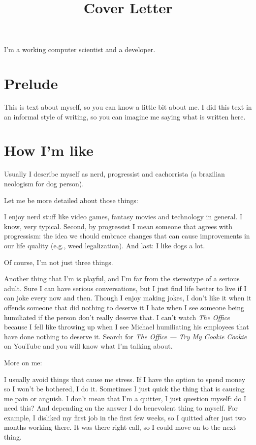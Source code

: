 \documentclass[11pt,a4paper,sans]{moderncv}
\title{Cover Letter}
\begin{document}
\makecvtitle %
I'm a working computer scientist and a developer.

\section{Prelude}
This is text about myself, so you can know a little bit about me.
I did this text in an informal style of writing, so you can imagine me saying what is written here.

\section{How I'm like}
Usually I describe myself as nerd, progressist and cachorrista (a brazilian neologism for dog person).

Let me be more detailed about those things:

I enjoy nerd stuff like video games, fantasy movies and technology in general.
I know, very typical.
Second, by progressist I mean someone that agrees with progressism: the idea we should embrace changes that can cause improvements in our life quality (e.g., weed legalization).
And last: I like dogs a lot.

\medskip

Of course, I'm not just three things.

\medskip

Another thing that I'm is playful, and I'm far from the stereotype of a serious adult.
Sure I can have serious conversations, but I just find life better to live if I can joke every now and then.
Though I enjoy making jokes, I don't like it when it offends someone that did nothing to deserve it
I hate when I see someone being humiliated if the person don't really deserve that.
I can't watch \textit{The Office} because I fell like throwing up when I see Michael humiliating his employees that have done nothing to deserve it.
Search for \textit{The Office — Try My Cookie Cookie} on YouTube and you will know what I'm talking about.

\medskip

More on me:

\medskip

I usually avoid things that cause me stress.
If I have the option to spend money so I won't be bothered, I do it.
Sometimes I just quick the thing that is causing me pain or anguish.
I don't mean that I'm a quitter, I just question myself: do I need this?
And depending on the answer I do benevolent thing to myself.
For example, I disliked my first job in the first few weeks, so I quitted after just two months working there.
It was there right call, so I could move on to the next thing.
\end{document}
